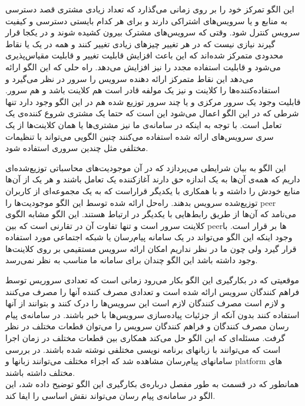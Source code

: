 
این الگو تمرکز خود را بر روی زمانی می‌گذارد که تعداد زیادی مشتری قصد دسترسی به منابع و یا سرویس‌های اشتراکی دارند و برای هر کدام بایستی دسترسی و کیفیت سرویس کنترل شود. وقتی که سرویس‌های مشترک بیرون کشیده شوند و در یکجا قرار گیرند نیازی نیست که در هر تغییر چیزهای زیادی تغییر کنند و همه در یک یا نقاط محدودی متمرکز شده‌اند که این باعث افزایش قابلیت تغییر و قابلیت مقیاس‌پذیری می‌شود و قابلیت استفاده مجدد را نیز افزایش می‌دهد. راه حلی که این الگو ارائه می‌دهد این نقاط متمرکز ارائه دهنده سرویس را سرور در نظر می‌گیرد و استفاده‌کننده‌ها را کلاینت و نیز یک مولفه قادر است هم کلاینت باشد و هم سرور. قابلیت وجود یک سرور مرکزی و یا چند سرور توزیع شده هم در این الگو وجود دارد تنها شرطی که در این الگو  اعمال می‌شود این است که  حتما یک  مشتری شروع کننده‌ی یک تعامل است. با توجه به اینکه در سامانه‌ی ما نیز مشتری‌ها یا همان کلاینت‌ها از یک سری سرویس‌های ارائه شده استفاده می‌کنند چنین الگویی می‌تواند با تنظیمات مختلفی مثل چندین سروری استفاده شود.


این الگو به بیان شرایطی می‌پردازد که در آن موجودیت‌های محاسباتی توزیع‌شده‌ای داریم که همه‌ی آن‌ها به یک اندازه حق دارند آغازکننده یک تعامل باشند و هر یک از آن‌ها منابع خودش را داشته و با همکاری با یکدیگر قراراست که به یک مجموعه‌ای از کاربران توزیع‌شده سرویس بدهند. راه‌حل ارائه شده‌ توسط این الگو موجودیت‌ها را peer می‌نامد که آن‌ها از طریق رابط‌هایی با یکدیگر در ارتباط هستند. این الگو مشابه الگوی کلاینت سرور است و تنها تفاوت آن در تقارنی است که بین peerها بر قرار است. با وجود اینکه این الگو می‌تواند در یک سامانه پیام‌رسان یا شبکه اجتماعی مورد استفاده قرار گیرد ولی چون ما در نظر نداریم امکان ارائه سرویس مستقیمی بر روی کلاینت‌ها وجود داشته باشد این الگو چندان برای سامانه ما مناسب به نظر نمی‌رسد.



موقعیتی که در بکارگیری این الگو بکار می‌رود زمانی است که تعدادی سروریس توسط فراهم کنندگان سرویس ارائه شده است و تعدادی مصرف کننده آنها را مصرف می‌کنند و لازم است مصرف کنندگان لازم است این سرویس‌ها را درک کنند و بتوانند از آنها استفاده کنند بدون آنکه از جزئیات پیاده‌سازی سرویس‌ها با خبر باشند. در سامانه‌ی پیام رسان مصرف کنندگان و فراهم کنندگان سرویس را می‌توان قطعات مختلف در نظر گرفت. مسئله‌ای که این الگو حل می‌کند همکاری بین قطعات مختلف در زمان اجرا است که می‌توانند با زبانهای برنامه نویسی مختلفی نوشته شده باشند. در بررسی سامانهای پیام‌رسان مشاهده شد که اجزاء مختلف می‌توانند زبانها و platform های مختلف داشته باشند. \\
همانطور که در قسمت   به طور مفصل درباره‌ی بکارگیری این الگو توضیح داده شد، این الگو در سامانه‌ی پیام‌ رسان می‌تواند نقش اساسی را ایفا کند.

